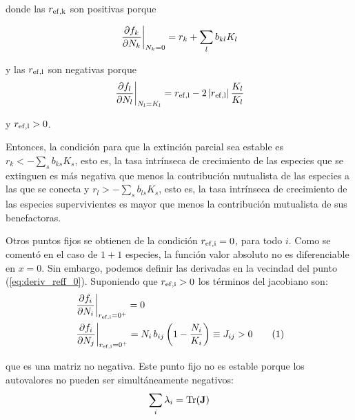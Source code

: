\noindent donde las $r_{\rm{ef},k}$ son positivas porque

\begin{equation}
\displaystyle
\left.\frac{\partial f_k}{\partial N_k} \right|_{N_k=0} = r_k + \sum_{l}b_{kl}K_l\\
\label{eq:partial_N_0}
\end{equation}

\noindent y las $r_{\rm{ef},l}$ son negativas porque
\begin{equation}
\displaystyle
\left.\frac{\partial f_l}{\partial N_l} \right|_{N_l=K_l} = r_{\rm{ef},l} - 2 \left| r_{\rm{ef},l} \right| \frac{K_l}{K_l} \\
\label{eq:partial_N_K}
\end{equation}

\noindent y $r_{\rm{ef},l}>0$.

Entonces, la condición para que la extinción parcial sea estable es $r_k<-\sum_{s}b_{ks}K_s$, esto es, la tasa intrínseca de crecimiento de las especies que se extinguen es más negativa que menos la contribución mutualista de las especies a las que se conecta y $r_l>-\sum_{s}b_{ls}K_s$, esto es, la tasa intrínseca de crecimiento de las especies supervivientes es mayor que menos la contribución mutualista de sus benefactoras.

Otros puntos fijos se obtienen de la condición $r_{\rm{ef},i}=0$, para todo $i$. Como se comentó en el caso de $1+1$ especies, la función valor absoluto no es diferenciable en $x=0$. Sin embargo, podemos definir las derivadas en la vecindad del punto (\ref{eq:deriv_reff_0}). Suponiendo que $r_{\rm{ef},i}>0$ los términos del jacobiano son:
\begin{align*}
\displaystyle
&\left.\frac{\partial f_i}{\partial N_i} \right|_{r_{\rm{ef},i}=0^{+}} =0\\
&\left.\frac{\partial f_i}{\partial N_j} \right|_{r_{\rm{ef},i}=0^{+}} =N_i\,b_{ij} \left( 1- \frac{N_i}{K_i} \right) \equiv J_{ij}>0
\stepcounter{equation}\tag{\theequation}
\label{eq:rmefi0}
\end{align*}

\noindent que es una matriz no negativa. Este punto fijo no es estable porque los autovalores no pueden ser simultáneamente negativos:
\begin{equation}
\displaystyle
  \sum_i \lambda_i = \rm{Tr} (\mathbf{J})
\end{equation}

